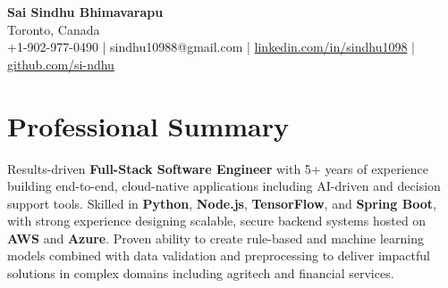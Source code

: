 \documentclass[letterpaper,11pt]{article}
\begin{document}
\begin{center}
  {\Large \textbf{Sai Sindhu Bhimavarapu}} \\
  Toronto, Canada \\
  +1-902-977-0490 \enspace | \enspace sindhu10988@gmail.com \enspace | \enspace \href{https://www.linkedin.com/in/sindhu1098/}{linkedin.com/in/sindhu1098} \enspace | \enspace \href{https://github.com/si-ndhu}{github.com/si-ndhu}
\end{center}

\section{Professional Summary}
  \begin{itemize}[leftmargin=0.15in, label={}]
    \small{\item{
     Results-driven \textbf{Full-Stack Software Engineer} with 5+ years of experience building end-to-end, cloud-native applications including AI-driven and decision support tools. Skilled in \textbf{Python}, \textbf{Node.js}, \textbf{TensorFlow}, and \textbf{Spring Boot}, with strong experience designing scalable, secure backend systems hosted on \textbf{AWS} and \textbf{Azure}. Proven ability to create rule-based and machine learning models combined with data validation and preprocessing to deliver impactful solutions in complex domains including agritech and financial services.
    }}
  \end{itemize}
\vspace{-16pt}

\end{document}

